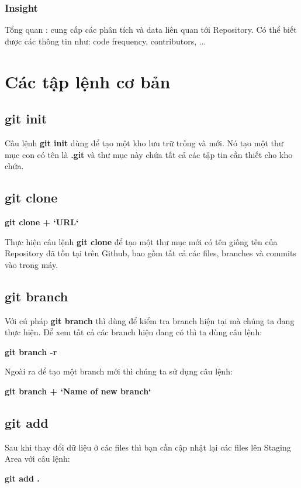 \documentclass[a4paper]{report}
\begin{document}
\subsection{Insight}
\textrm{Tổng quan : cung cấp các phân tích và data liên quan tới Repository. Có thể biết được các thông tin như: code frequency, contributors, ...}

\chapter{Các tập lệnh cơ bản}
\section{git init}
\textrm{Câu lệnh \textbf{git init} dùng để tạo một kho lưu trữ trống và mới.}
\newline
\textrm{Nó tạo một thư mục con có tên là \textbf{.git} và thư mục này chứa tất cả các tập tin cần thiết cho kho chứa.} 

\section{git clone}
\vspace{5pt}
\centerline{\textbf{git clone + `URL`}}
\textrm{Thực hiện câu lệnh \textbf{git clone} để tạo một thư mục mới có tên giống tên của Repository đã tồn tại trên Github, bao gồm tất cả các files, branches và commits vào trong máy.}

\section{git branch}
\textrm{Với cú pháp \textbf{git branch} thì dùng để kiểm tra branch hiện tại mà chúng ta đang thực hiện.}
\newline
\textrm{Để xem tất cả các branch hiện đang có thì ta dùng câu lệnh:}
\newline
\centerline{\textbf{git branch -r}}
\newline
\textrm{Ngoài ra để tạo một branch mới thì chúng ta sử dụng câu lệnh:}
\newline
\centerline{\textbf{git branch + `Name of new branch`}}

\section{git add}
\label{subsec:labelone}
\textrm{Sau khi thay đổi dữ liệu ở các files thì bạn cần cập nhật lại các files lên Staging Area với câu lệnh:}
\newline
\centerline{\textbf{git add .}}
\end{document}
